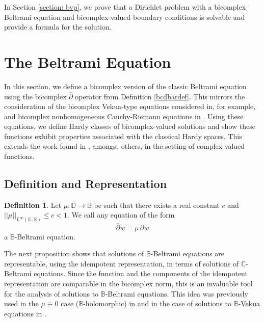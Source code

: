 \documentclass[12pt,reqno]{amsart}
\theoremstyle{definition}
\newtheorem{deff}[theorem]{Definition}
\theoremstyle{remark}
\newcommand{\p}{\partial}
\newcommand{\dbar}{\bar\partial}
\newcommand{\bc}{\mathbb{B}}
\newcommand{\disk}{\mathbb{D}}
\begin{document}
In Section \ref{section: bvp}, we prove that a Dirichlet problem with a bicomplex Beltrami equation and bicomplex-valued boundary conditions is solvable and provide a formula for the solution. 


    

\section{The Beltrami Equation}\label{section: beleqn}

In this section, we define a bicomplex version of the classic Beltrami equation using the bicomplex $\dbar$ operator from Definition \ref{bcdbardef}. This mirrors the consideration of the bicomplex Vekua-type equations considered in, for example, \cite{BCTransmutation, BCBergman, FundBicomplex, ComplexSchr,BCHoiv, BCHarmVek} and bicomplex nonhomogeneous Cauchy-Riemann equations in \cite{BCAtomic, BCSchwarz}. Using these equations, we define Hardy classes of bicomplex-valued solutions and show these functions exhibit properties associated with the classical Hardy spaces. This extends the work found in \cite{Zins, quasiHardy, quasiHardy2}, amongst others, in the setting of complex-valued functions.


    \subsection{Definition and Representation}

    

\begin{deff}
    Let $\mu : \disk \to \bc$ be such that there exists a real constant $c$ and $||\mu||_{L^\infty(\disk,\bc)} \leq c < 1$. We call any equation of the form 
    \[
        \dbar w = \mu \, \p w
    \]
    a $\bc$-Beltrami equation. 
\end{deff}

The next proposition shows that solutions of $\bc$-Beltrami equations are representable, using the idempotent representation, in terms of solutions of $\mathbb{C}$-Beltrami equations. Since the function and the components of the idempotent representation are comparable in the bicomplex norm, this is an invaluable tool for the analysis of solutions to $\bc$-Beltrami equations. This idea was previously used in the $\mu \equiv 0$ case ($\bc$-holomorphic) in \cite{BCAtomic} and in the case of solutions to $\bc$-Vekua equations in \cite{BCHoiv, BCHarmVek}.  
\end{document}
